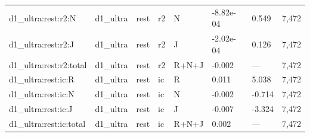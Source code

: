 \begin{tabular}{llllllll}
d1\_ultra:rest:r2:N & d1\_ultra & rest & r2 & N & -8.82e-04 & 0.549 & 7,472 \\
d1\_ultra:rest:r2:J & d1\_ultra & rest & r2 & J & -2.02e-04 & 0.126 & 7,472 \\
d1\_ultra:rest:r2:total & d1\_ultra & rest & r2 & R+N+J & -0.002 & — & 7,472 \\
d1\_ultra:rest:ic:R & d1\_ultra & rest & ic & R & 0.011 & 5.038 & 7,472 \\
d1\_ultra:rest:ic:N & d1\_ultra & rest & ic & N & -0.002 & -0.714 & 7,472 \\
d1\_ultra:rest:ic:J & d1\_ultra & rest & ic & J & -0.007 & -3.324 & 7,472 \\
d1\_ultra:rest:ic:total & d1\_ultra & rest & ic & R+N+J & 0.002 & — & 7,472 \\
\bottomrule
\end{tabular}
